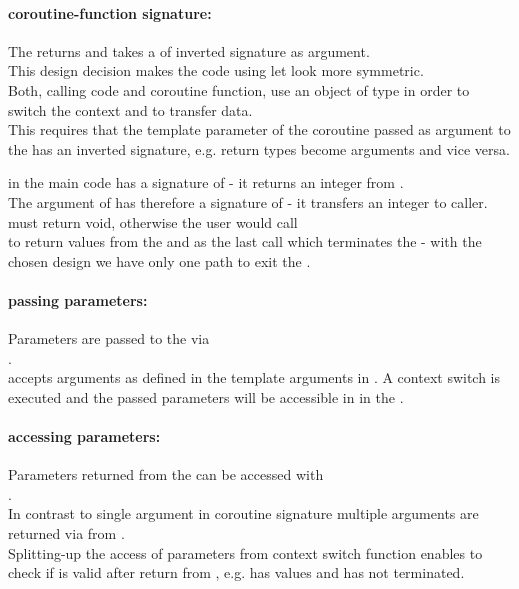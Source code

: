 \paragraph*{coroutine-function signature:}
The \corofunction returns  and takes a \coro of inverted signature
as argument.\\
\newline
This design decision makes the code using \coro let look more symmetric.\\
Both, calling code and coroutine function, use an object of type \coro in order
to switch the context and to transfer data.\\
This requires that the template parameter of the coroutine passed as argument
to the \corofunction has an inverted signature, e.g. return types become
arguments and vice versa.

\coro in the main code has a signature of  - it returns an
integer from \corofunction.\\
The \coro argument of \corofunction {} has therefore a signature of
 - it transfers an integer to caller.\\
\newline
\corofunction must return void, otherwise the user would call\\
\coroop to return values from the \corofunction and  as the
last call which terminates the \corofunction - with the chosen design we have
only one path to exit the \corofunction.

\paragraph*{passing parameters:}
Parameters are passed to the \corofunction via\\\coroop.\\
\newline
\coroop accepts arguments as defined in the template arguments in \coro. A
context switch is executed and the passed parameters will be accessible in in
the \corofunction.

\paragraph*{accessing parameters:}
Parameters returned from the \corofunction can be accessed with\\\coroget.\\
\newline
In contrast to single argument in coroutine signature multiple arguments are
returned via \tuple from \coroget.\\
Splitting-up the access of parameters from context switch function enables to
check if \coro is valid after return from \coroop, e.g. \coro has values and
\corofunction has not terminated.


